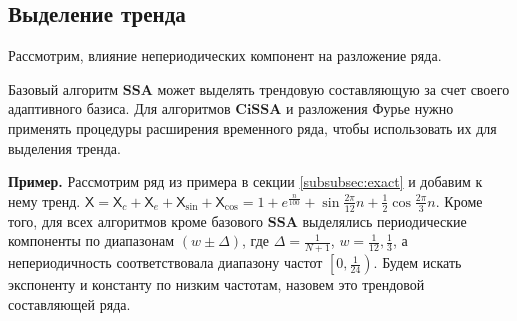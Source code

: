 \documentclass[a4paper, 11pt]{article}
\newcommand{\SSA}{\textbf{SSA}}
\newcommand{\CISSA}{\textbf{CiSSA}}
\newcommand{\TS}{\mathsf{X}}
\begin{document}
%


\subsection{Выделение тренда}

\label{subsubsec:trend}

Рассмотрим, влияние непериодических компонент на разложение ряда. 

Базовый алгоритм $\SSA$ может выделять трендовую составляющую за счет своего адаптивного базиса. Для алгоритмов $\CISSA$ и разложения Фурье нужно применять процедуры расширения временного ряда, чтобы использовать их для выделения тренда. 

\textbf{\large{Пример.}} Рассмотрим ряд из примера в секции \ref{subsubsec:exact} и добавим к нему тренд. $\TS = \TS_{c} + \TS_e + \TS_{\sin} + \TS_{\cos} = 1 + e^{\frac{n}{100}} + \sin{\frac{2\pi}{12}n} + \frac{1}{2}\cos{\frac{2\pi}{3}n}$. 
Кроме того, для всех алгоритмов кроме базового $\SSA$ выделялись периодические компоненты по диапазонам $\left(w \pm \Delta \right)$, где $\Delta = \frac{1}{N+1}$, $w = \frac{1}{12}, \frac{1}{3}$, а непериодичность соответствовала диапазону частот $\left[0, \frac{1}{24} \right)$.
 Будем искать экспоненту и константу по низким частотам, назовем это трендовой составляющей ряда.
\end{document}
